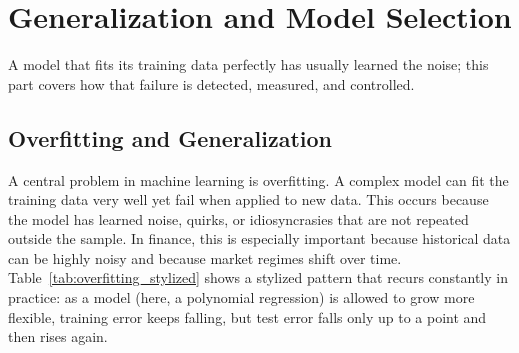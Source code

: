 \documentclass[../ai_in_finance]{subfiles}
\begin{document}
\begin{figure}[htbp]
\centering
\begin{lrbox}{\bookmeasuredbox}
\end{lrbox}
\ifdim\wd\bookmeasuredbox<0.65\linewidth
\setlength{\bookcapwidth}{0.65\linewidth}
\else
\setlength{\bookcapwidth}{\wd\bookmeasuredbox}
\fi
{}
\end{figure}

\section{Generalization and Model Selection}

A model that fits its training data perfectly has usually learned the noise; this part covers how that failure is detected, measured, and controlled.

\subsection{Overfitting and Generalization}
\label{sec:overfitting-section}

A central problem in machine learning is overfitting. A complex model can fit the training data very well yet fail when applied to new data. This occurs because the model has learned noise, quirks, or idiosyncrasies that are not repeated outside the sample. In finance, this is especially important because historical data can be highly noisy and because market regimes shift over time. Table~\ref{tab:overfitting_stylized} shows a stylized pattern that recurs constantly in practice: as a model (here, a polynomial regression) is allowed to grow more flexible, training error keeps falling, but test error falls only up to a point and then rises again.
\end{document}
